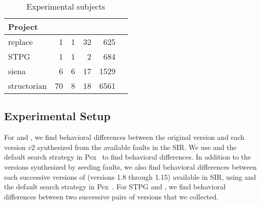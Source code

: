\setlength{\tabcolsep}{6pt}
\begin{table}
\begin{CodeOut}
\begin{center}
\caption {\label{table:subjects}Experimental subjects}
\begin {tabular} {|l|r|r|r|r|r|}
\hline
Project&\CenterCell{Classes}&\CenterCell{Classes Covered}&\CenterCell{Versions}&\CenterCell{LOC}\\

\hline
\hline replace &1&1&32&625\\
\hline STPG &1&1&2&684\\
\hline siena &6&6&17&1529\\
\hline structorian &70&8&18&6561\\
\hline
\end{tabular}
\end{center}
\end{CodeOut}
\end{table}



\subsection{Experimental Setup}

For  and , we find behavioral differences between the original version and each version $v2$ synthesized from the available faults in the SIR. We use  and the default search strategy in Pex~\cite{Pex, fitnex} to find behavioral differences. In addition to the versions synthesized by seeding faults, we also find behavioral differences between each successive versions of  (versions 1.8 through 1.15) available in SIR, using  and the default search strategy in Pex~\cite{Pex, fitnex}. For STPG and , we find behavioral differences between two successive pairs of versions that we collected. 

